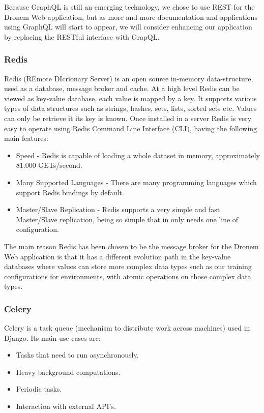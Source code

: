 \par Because GraphQL is still an emerging technology, we chose to use REST for the Dronem Web application, but as more and more documentation and applications using GraphQL will start to appear, we will consider enhancing our application by replacing the RESTful interface with GrapQL.

\subsubsection{Redis}

Redis (REmote DIcrionary Server) \cite{redis} is an open source in-memory data-structure, used as a database, message broker and cache. At a high level Redis can be viewed as key-value database, each value is mapped by a key.
It supports various types of data structures such as strings, hashes, sets, lists, sorted sets etc. Values can only be retrieve it its key is known.
Once installed in a server Redis is very easy to operate using Redis Command Line Interface (CLI), having the following main features:

\begin{itemize}
    \item Speed - Redis is capable of loading a whole dataset in memory, approximately 81.000 GETs/second.
    \item Many Supported Languages - There are many programming languages which support Redis bindings by default.
    \item Master/Slave Replication - Redis supports a very simple and fast Master/Slave replication, being so simple that in only needs one line of configuration.
\end{itemize}

The main reason Redis has been chosen to be the message broker for the Dronem Web application is that it has a different evolution path in the key-value databases where values can store more complex data types such as our training configurations for environments, with atomic operations on those complex data types.

\subsubsection{Celery}
Celery \cite{celery} is a task queue (mechanism to distribute work across machines) used in Django. Its main use cases are:
\begin{itemize}
    \item Tasks that need to run asynchronously.
    \item Heavy background computations.
    \item Periodic tasks.
    \item Interaction with external API's.
\end{itemize}

